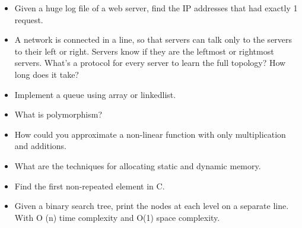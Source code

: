 \documentclass{article}
\begin{document}
\begin{itemize}
	\item Given a huge log file of a web server, find the IP addresses that had exactly 1 request.
	\item A network is connected in a line, so that servers can talk only to the servers to their left or right. Servers know if they are the leftmost or rightmost servers. What's a protocol for every server to learn the full topology? How long does it take?
	\item Implement a queue using array or linkedlist.
	\item What is polymorphism?
	\item How could you approximate a non-linear function with only multiplication and additions. 
	\item What are the techniques for allocating static and dynamic memory.
	\item Find the first non-repeated element in C.
	\item Given a binary search tree, print the nodes at each level on a separate line. With O (n) time complexity and O(1) space complexity.
\end{itemize}
\end{document}
